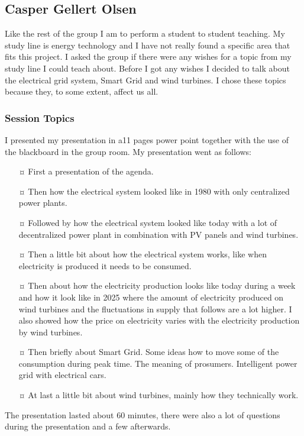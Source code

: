 \subsection{Casper Gellert Olsen}
Like the rest of the group I am to perform a student to student teaching. My study line is energy technology and I have not really found a specific area that fits this project. I asked the group if there were any wishes for a topic from my study line I could teach about. Before I got any wishes I decided to talk about the electrical grid system, Smart Grid and wind turbines. I chose these topics because they, to some extent, affect us all.

\subsubsection{Session Topics}
I presented my presentation in a11 pages power point together with the use of the blackboard in the group room. My presentation went as follows:
\begin{itemize}
\item[¤] First a presentation of the agenda.
\item[¤] Then how the electrical system looked like in 1980 with only centralized power plants.
\item[¤] Followed by how the electrical system looked like today with a lot of decentralized power plant in combination with PV panels and wind turbines.
\item[¤] Then a little bit about how the electrical system works, like when electricity is produced it needs to be consumed.
\item[¤] Then about how the electricity production looks like today during a week and how it look like in 2025 where the amount of electricity produced on wind turbines and the fluctuations in supply that follows are a lot higher. I also showed how the price on electricity varies with the electricity production by wind turbines.
\item[¤] Then briefly about Smart Grid. Some ideas how to move some of the consumption during peak time. The meaning of prosumers. Intelligent power grid with electrical cars.
\item[¤] At last a little bit about wind turbines, mainly how they technically work.
\end{itemize}

The presentation lasted about 60 minutes, there were also a lot of questions during the presentation and a few afterwards.

